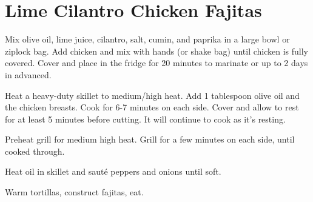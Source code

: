 \section{Lime Cilantro Chicken Fajitas}
\begin{recipe}



	Mix olive oil, lime juice, cilantro, salt, cumin, and paprika in a large bowl or ziplock bag. Add chicken and mix with  hands (or shake bag) until chicken is fully covered. Cover and place in the fridge for 20 minutes to marinate or up to 2 days in advanced.

 Heat a heavy-duty skillet to medium/high heat. Add 1 tablespoon olive oil and the chicken breasts. Cook for 6-7 minutes on each side. Cover and allow to rest for at least 5 minutes before cutting. It will continue to cook as it's resting.

 Preheat grill for medium high heat. Grill for a few minutes on each side, until cooked through.

	Heat oil in skillet and saut\'{e} peppers and onions until soft.

	Warm tortillas, construct fajitas, eat.


\end{recipe}

